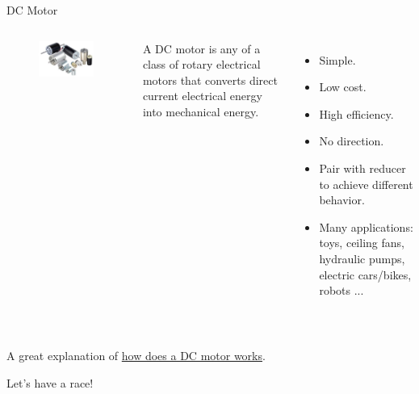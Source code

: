 \documentclass[12pt,letterpaper]{beamer}
\begin{document}
\begin{frame}{DC Motor}

\begin{columns}

\begin{figure}
    \includegraphics[width=.5\textwidth]{dc_motors}
\end{figure}

{\small A DC motor is any of a class of rotary electrical motors that converts direct current electrical energy into mechanical energy.} 
{\scriptsize 
\begin{itemize}
    \item Simple.
    \item Low cost.
    \item High efficiency.
    \item No direction.
    \item Pair with reducer to achieve different behavior.
    \item Many applications: toys, ceiling fans, hydraulic pumps, electric cars/bikes, robots ...
\end{itemize}
}

\end{columns}
\hfill \\
A great explanation of \href{https://youtu.be/CWulQ1ZSE3c}{how does a DC motor works}.

\end{frame}

\begin{frame}
    \centering Let's have a race!
\end{frame}
\end{document}
